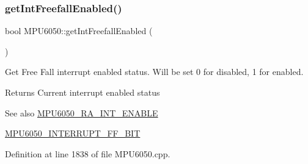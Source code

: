 \begin{DoxyCode}{0}

\end{DoxyCode}
\mbox{\label{classMPU6050_a500bb2df2e46eaecd3fb2ba7304a5ed3}} 
\subsubsection{\texorpdfstring{getIntFreefallEnabled()}{getIntFreefallEnabled()}}
{\footnotesize\ttfamily bool M\+P\+U6050\+::get\+Int\+Freefall\+Enabled (\begin{DoxyParamCaption}{ }\end{DoxyParamCaption})}

Get Free Fall interrupt enabled status. Will be set 0 for disabled, 1 for enabled. \begin{DoxyReturn}{Returns}
Current interrupt enabled status 
\end{DoxyReturn}
\begin{DoxySeeAlso}{See also}
\mbox{\hyperlink{MPU6050_8h_a1de9d9557aa7420c746721999df4a377}{M\+P\+U6050\+\_\+\+R\+A\+\_\+\+I\+N\+T\+\_\+\+E\+N\+A\+B\+LE}} 

\mbox{\hyperlink{MPU6050_8h_a95b5ee3f5f796515c31f0b59f9ce0019}{M\+P\+U6050\+\_\+\+I\+N\+T\+E\+R\+R\+U\+P\+T\+\_\+\+F\+F\+\_\+\+B\+IT}} 
\end{DoxySeeAlso}


Definition at line 1838 of file M\+P\+U6050.\+cpp.


